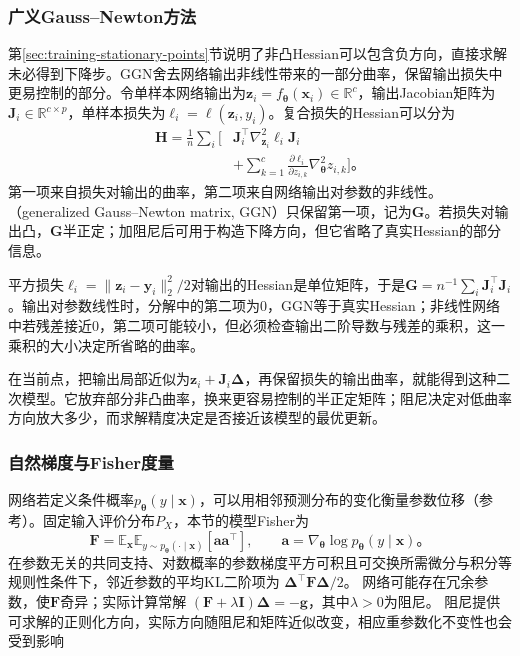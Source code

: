 \subsubsection{广义Gauss--Newton方法}
\label{sec:training-generalized-curvature}

第\ref{sec:training-stationary-points}节说明了非凸Hessian可以包含负方向，直接求解未必得到下降步。GGN舍去网络输出非线性带来的一部分曲率，保留输出损失中更易控制的部分。令单样本网络输出为$\bm z_i=f_{\bm\theta}(\bm x_i)\in\mathbb R^c$，输出Jacobian矩阵为$\bm J_i\in\mathbb R^{c\times p}$，单样本损失为$\ell_i=\ell(\bm z_i,y_i)$。复合损失的Hessian可以分为
\begin{equation}
  \begin{aligned}
  \bm H=\frac1n\sum_i\bigg[
    &\bm J_i^{\top}\nabla_{\bm z_i}^2\ell_i\bm J_i\\
    &+\sum_{k=1}^c\frac{\partial\ell_i}{\partial z_{i,k}}
         \nabla_{\bm\theta}^2z_{i,k}\bigg]\text{。}
  \end{aligned}
  \label{eq:training-hessian-decomposition}
\end{equation}
第一项来自损失对输出的曲率，第二项来自网络输出对参数的非线性。（generalized Gauss--Newton matrix, GGN）只保留第一项，记为$\bm G$。若损失对输出凸，$\bm G$半正定；加阻尼后可用于构造下降方向，但它省略了真实Hessian的部分信息。

平方损失$\ell_i=\lVert\bm z_i-\bm y_i\rVert_2^2/2$对输出的Hessian是单位矩阵，于是$\bm G=n^{-1}\sum_i\bm J_i^{\top}\bm J_i$。输出对参数线性时，分解中的第二项为0，GGN等于真实Hessian；非线性网络中若残差接近0，第二项可能较小，但必须检查输出二阶导数与残差的乘积，这一乘积的大小决定所省略的曲率。

在当前点，把输出局部近似为$\bm z_i+\bm J_i\bm\Delta$，再保留损失的输出曲率，就能得到这种二次模型。它放弃部分非凸曲率，换来更容易控制的半正定矩阵；阻尼决定对低曲率方向放大多少，而求解精度决定是否接近该模型的最优更新。

\subsubsection{自然梯度与Fisher度量}
\label{sec:training-natural-gradient}

网络若定义条件概率$p_{\bm\theta}(y\mid\bm x)$，可以用相邻预测分布的变化衡量参数位移（参考）。固定输入评价分布$P_X$，本节的模型Fisher为
\begin{equation}
  \bm F=\mathbb E_{\bm x}\mathbb E_{y\sim p_{\bm\theta}(\cdot\mid\bm x)}
    [\bm a\bm a^{\top}],\qquad
  \bm a=\nabla_{\bm\theta}\log p_{\bm\theta}(y\mid\bm x)\text{。}
  \label{eq:training-fisher}
\end{equation}
在参数无关的共同支持、对数概率的参数梯度平方可积且可交换所需微分与积分等规则性条件下，邻近参数的平均KL二阶项为
$\bm\Delta^\top\bm F\bm\Delta/2$。
网络可能存在冗余参数，使$\bm F$奇异；实际计算常解
$(\bm F+\lambda\bm I)\bm\Delta=-\bm g$，其中$\lambda>0$为阻尼。
阻尼提供可求解的正则化方向，实际方向随阻尼和矩阵近似改变，相应重参数化不变性也会受到影响

